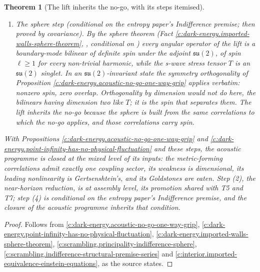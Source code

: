 \documentclass[11pt]{article}
\newtheorem{theorem}{Theorem}[section]
\theoremstyle{definition}
\theoremstyle{plain}
\begin{document}
\begin{theorem}[The lift inherits the no-go, with its steps itemised]
\begin{enumerate}
\item \emph{The sphere step (conditional on the entropy paper's Indifference premise; then proved by covariance).} By the sphere theorem (Fact \ref{c:dark-energy.imported-walls-sphere-theorem}, \cite[Thm.~5.5]{ButlerT8}, conditional on \cite[Principle~5.4]{ButlerT8}) every angular operator of the lift is a boundary-mode bilinear of definite spin under the adjoint $\mathfrak{su}(2)$, of spin $\ell \geq 1$ for every non-trivial harmonic, while the s-wave stress tensor $T$ is an $\mathfrak{su}(2)$ singlet. In an $\mathfrak{su}(2)$-invariant state the symmetry orthogonality of Proposition \ref{c:dark-energy.acoustic-no-go-one-way-grip} applies verbatim: nonzero spin, zero overlap. Orthogonality by dimension would \emph{not} do here, the bilinears having dimension two like $T$; it is the spin that separates them. The lift inherits the no-go because the sphere is built from the same correlations to which the no-go applies, and those correlations carry spin.
\end{enumerate}
With Propositions \ref{c:dark-energy.acoustic-no-go-one-way-grip} and \ref{c:dark-energy.point-infinity-has-no-physical-fluctuation} and these steps, the acoustic programme is closed at the mixed level of its inputs: the metric-forming correlations admit exactly one coupling sector, its weakness is dimensional, its leading nonlinearity is Gertsenshtein's, and its Goldstones are eaten. Step (2), the near-horizon reduction, is at assembly level, its promotion shared with T5 and T7; step (4) is conditional on the entropy paper's Indifference premise, and the closure of the acoustic programme inherits that condition.
\end{theorem}
\begin{proof}
Follows from \ref{c:dark-energy.acoustic-no-go-one-way-grip}, \ref{c:dark-energy.point-infinity-has-no-physical-fluctuation}, \ref{c:dark-energy.imported-walls-sphere-theorem}, \ref{c:scrambling.principality-indifference-sphere}, \ref{c:scrambling.indifference-structural-premise-series} and \ref{c:interior.imported-equivalence-einstein-equations}, as the source states.

\end{proof}
\end{document}
